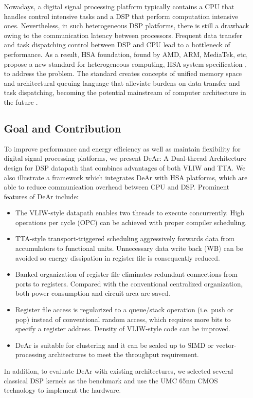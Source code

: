 \documentclass[12pt]{article}
\begin{document}
\begin{CJK}{UTF8}{bkai}
        Nowadays, a digital signal processing platform typically contains a CPU that handles control intensive tasks and a DSP that perform computation intensive ones.
        Nevertheless, in such heterogeneous DSP platforms, there is still a drawback owing to the communication latency between processors. 
        Frequent data transfer and task dispatching control between DSP and CPU lead to a  bottleneck of performance. 
        As a result, HSA foundation, found by AMD, ARM, MediaTek, etc, propose a new standard for heterogeneous computing, HSA system specification \cite{systemspec}, to address the problem. 
        The standard creates concepts of unified memory space and architectural queuing language that alleviate burdens on data transfer and task dispatching, becoming the potential mainstream of computer architecture in the future \cite{mainstream}.

    \subsection{Goal and Contribution}
        To improve performance and energy efficiency as well as maintain flexibility for digital signal processing platforms, 
        we present DeAr: A Dual-thread Architecture design for DSP datapath that combines advantages of both VLIW and TTA.
        We also illustrate a framework which integrates DeAr with HSA platforms, which are able to reduce communication overhead between CPU and DSP. 
        Prominent features of DeAr include:
        \begin{itemize}
            \item The VLIW-style datapath enables two threads to execute concurrently. High operations per cycle (OPC) can be achieved with proper compiler scheduling.
            \item TTA-style transport-triggered scheduling aggressively forwards data from accumulators to functional units. Unnecessary data write back (WB) can be avoided so energy dissipation in register file is consequently reduced.
            \item Banked organization of register file eliminates redundant connections from ports to registers. Compared with the conventional centralized organization, both power consumption and circuit area are saved.
            \item Register file access is regularized to a queue/stack operation (i.e. push or pop) instead of conventional random access, which requires more bits to specify a register address. Density of VLIW-style code can be improved.
            \item DeAr is suitable for clustering and it can be scaled up to SIMD or vector-processing architectures to meet the throughput requirement.
        \end{itemize}
        In addition, to evaluate DeAr with existing architectures, we selected several classical DSP kernels \cite{dspstone} \cite{bdti} as the benchmark and use the UMC 65nm CMOS technology to implement the hardware.


\end{CJK}
\end{document}
